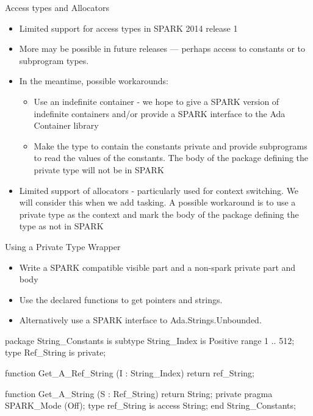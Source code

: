 \documentclass{beamer}
\begin{document}
\begin{frame}{Access types and Allocators}

  \begin{itemize}

  \item Limited support for access types in SPARK 2014 release 1
  \item More may be possible in future releases --- perhaps access to constants or to subprogram types. 
  \item In the meantime, possible workarounds:
   \begin{itemize}
    \item Use an indefinite container - we hope to give a SPARK
      version of indefinite containers and/or provide a SPARK
      interface to the Ada Container library
   \item Make the type to contain the constants private and provide
     subprograms to read the values of the constants. The body of the
     package defining the private type will not be in SPARK
  \end{itemize}
  \item Limited support of allocators - particularly used for context
    switching.  We will consider this when we add tasking. A possible
    workaround is to use a private type as the context and mark the
    body of the package defining the type as not in SPARK
  \end{itemize}

\end{frame}

\begin{frame}[fragile]{Using a Private Type Wrapper}

  \begin{itemize}

    \item Write a SPARK compatible visible part and a non-spark private part and body
    \item Use the declared functions to get pointers and strings.
    \item Alternatively use a SPARK interface to Ada.Strings.Unbounded. 
  \end{itemize}

  \begin{pxcode}[language=SPARK,style=tinystyle,gobble=4]
    package String_Constants
    is
        subtype String_Index is Positive range 1 .. 512;
        type Ref_String is private;

        function Get_A_Ref_String (I : String_Index) return ref_String;

        function Get_A_String (S : Ref_String) return String;
    private
       pragma SPARK_Mode (Off);
       type ref_String is access String;
   end String_Constants; 
  \end{pxcode}

\end{frame}
\end{document}
